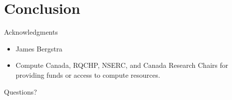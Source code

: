 \documentclass[utf8x,xcolor=pdftex,dvipsnames,table]{beamer}
\begin{document}

\section{Conclusion}
\begin{frame}
  \tableofcontents[currentsection]
\end{frame}

\begin{frame}{Acknowledgments}
\begin{itemize}
\item James Bergstra
\item Compute Canada, RQCHP, NSERC, and Canada Research Chairs for providing funds or access to compute resources.
\end{itemize}
\end{frame}

\begin{frame}
\begin{center}
\Huge
Questions?
\end{center}
\end{frame}
\end{document}
